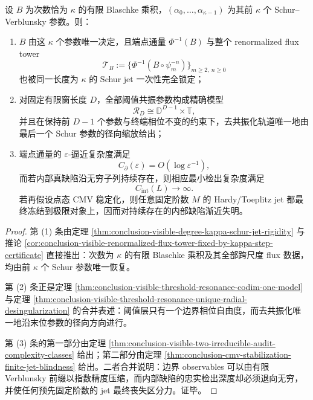 \begin{theorem}\label{thm:conclusion-toeplitz-cmv-finite-schur-locking-bifurcation}
设 \(B\) 为次数恰为 \(\kappa\) 的有限 Blaschke 乘积，\((\alpha_0,\dots,\alpha_{\kappa-1})\) 为其前 \(\kappa\) 个 Schur--Verblunsky 参数。则：
\begin{enumerate}
  \item \(B\) 由这 \(\kappa\) 个参数唯一决定，且端点通量 \(\Phi^{-1}(B)\) 与整个 renormalized flux tower
  \[
  \mathcal T_B:=\{\Phi^{-1}(B\circ\psi_m^{-n})\}_{m\ge 2,\ n\ge 0}
  \]
  也被同一长度为 \(\kappa\) 的 Schur jet 一次性完全锁定；
  \item 对固定有限窗长度 \(D\)，全部阈值共振参数构成精确模型
  \[
  \mathcal R_D\cong \mathbb D^{D-1}\times \mathbb T,
  \]
  并且在保持前 \(D-1\) 个参数与终端相位不变的约束下，去共振化轨道唯一地由最后一个 Schur 参数的径向缩放给出；
  \item 端点通量的 \(\varepsilon\)-逼近复杂度满足
  \[
  C_{\partial}(\varepsilon)=O(\log \varepsilon^{-1}),
  \]
  而若内部真缺陷沿无穷子列持续存在，则相应最小检出复杂度满足
  \[
  C_{\mathrm{int}}(L)\to\infty.
  \]
  若再假设点态 CMV 稳定化，则任意固定阶数 \(M\) 的 Hardy/Toeplitz jet 都最终冻结到极限对象上，因而对持续存在的内部缺陷渐近失明。
\end{enumerate}
\end{theorem}
\begin{proof}
第 (1) 条由定理 \ref{thm:conclusion-visible-degree-kappa-schur-jet-rigidity} 与推论 \ref{cor:conclusion-visible-renormalized-flux-tower-fixed-by-kappa-step-certificate} 直接推出：次数为 \(\kappa\) 的有限 Blaschke 乘积及其全部跨尺度 flux 数据，均由前 \(\kappa\) 个 Schur 参数唯一恢复。

第 (2) 条正是定理 \ref{thm:conclusion-visible-threshold-resonance-codim-one-model} 与定理 \ref{thm:conclusion-visible-threshold-resonance-unique-radial-desingularization} 的合并表述：阈值层只有一个边界相位自由度，而去共振化唯一地沿末位参数的径向方向进行。

第 (3) 条的第一部分由定理 \ref{thm:conclusion-visible-two-irreducible-audit-complexity-classes} 给出；第二部分由定理 \ref{thm:conclusion-cmv-stabilization-finite-jet-blindness} 给出。二者合并说明：边界 observables 可以由有限 Verblunsky 前缀以指数精度压缩，而内部缺陷的忠实检出深度却必须退向无穷，并使任何预先固定阶数的 jet 最终丧失区分力。证毕。
\end{proof}

